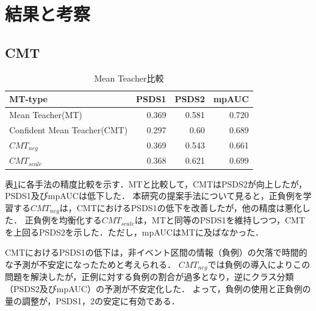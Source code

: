 \documentclass[main]{subfiles}
\begin{document}
\section{結果と考察}
\subsection{CMT}
\begin{table}[H]
 \begin{center}
   \begin{tabular}{|l|r|r|r|}
    \hline
    MT-type                       & PSDS1 & PSDS2 & mpAUC \\
    \hline
    Mean Teacher(MT)            & 0.369 & 0.581 & 0.720 \\
    Confident Mean Teacher(CMT) & 0.297 & 0.60  & 0.689 \\
    $CMT_{neg}$                     & 0.369 & 0.543 & 0.661 \\
    $CMT_{scale}$                 & 0.368 & 0.621 & 0.699 \\
    \hline
  \end{tabular}
   \caption{Mean Teacher比較}
   \label{table:mtAcc}
\end{center}
\end{table}

表\ref{table:mtAcc}に各手法の精度比較を示す．MTと比較して，CMTはPSDS2が向上したが，PSDS1及びmpAUCは低下した．
本研究の提案手法について見ると，正負例を学習する$CMT_{neg}$は，CMTにおけるPSDS1の低下を改善したが，他の精度は悪化した．
正負例を均衡化する$CMT_{scale}$は，MTと同等のPSDS1を維持しつつ，CMTを上回るPSDS2を示した．ただし，mpAUCはMTに及ばなかった．\par

CMTにおけるPSDS1の低下は，非イベント区間の情報（負例）の欠落で時間的な予測が不安定になったためと考えられる．
$CMT_{neg}$では負例の導入によりこの問題を解決したが，正例に対する負例の割合が過多となり，逆にクラス分類（PSDS2及びmpAUC）の予測が不安定化した．
よって，負例の使用と正負例の量の調整が，PSDS1，2の安定に有効である．\par
\end{document}
